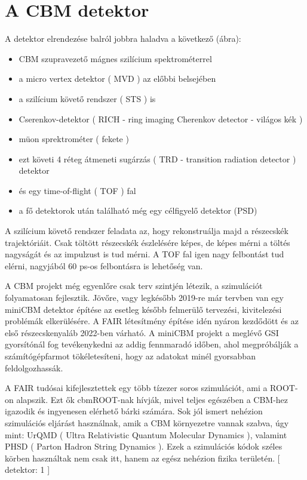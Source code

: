 \documentclass[a4paper,12pt]{article}
\begin{document}
\section{A CBM detektor}
\par A detektor elrendezése balról jobbra haladva a következő (ábra):
\begin{itemize}
	\item CBM szupravezető mágnes szilícium spektrométerrel
	\item a micro vertex detektor ( MVD ) az előbbi belsejében
	\item a szilícium követő rendszer ( STS ) is
	\item Cserenkov-detektor ( RICH - ring imaging Cherenkov detector - világos kék )
	\item müon sprektrométer ( fekete )
	\item ezt követi 4 réteg átmeneti sugárzás ( TRD - transition radiation detector ) detektor
	\item és egy time-of-flight ( TOF ) fal
	\item a fő detektorok után található még  egy célfigyelő detektor (PSD)  
\end{itemize}
\par A szilícium követő rendszer feladata az, hogy rekonstruálja majd a részecskék trajektóriáit. Csak töltött részecskék észlelésére képes, 
de képes mérni a töltés nagyságát és az impulzust is tud mérni. A TOF fal igen nagy felbontást tud elérni, nagyjából 60 ps-os felbontásra is
lehetőség van.
\par A CBM projekt még egyenlőre csak terv szintjén létezik, a szimulációt folyamatosan fejlesztik. Jövőre, vagy legkésőbb 2019-re már tervben 
van egy miniCBM detektor építése az esetleg később felmerülő tervezési, kivitelezési problémák elkerülésére. A FAIR létesítmény építése idén 
nyáron kezdődött és az első részecskenyaláb 2022-ben várható. A miniCBM projekt a meglévő GSI gyorsítónál fog tevékenykedni az addig fennmaradó
időben, ahol megpróbálják a számítógépfarmot tökéletesíteni, hogy az adatokat minél gyorsabban feldolgozhassák.
\par A FAIR tudósai kifejlesztettek egy több tízezer soros szimulációt, ami a ROOT-on alapszik. Ezt ők cbmROOT-nak hívják, mivel teljes
egészében a CBM-hez igazodik és ingyenesen elérhető bárki számára. Sok jól ismert nehézion szimulációs eljárást használnak, amik a CBM
környezetre vannak szabva, úgy mint: UrQMD ( Ultra Relativistic Quantum Molecular Dynamics ), valamint  PHSD ( Parton Hadron String Dynamics ).
 Ezek a szimulációs kódok széles körben használtak nem csak itt, hanem az egész nehézion fizika területén. [ detektor: 1 ]
\end{document}
